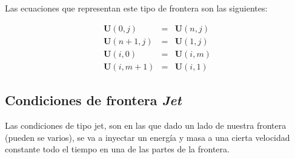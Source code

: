 \documentclass[12pt,a4paper]{book}
\begin{document}
Las ecuaciones que representan este tipo de frontera son las siguientes:

\begin{eqnarray}
\textbf{U}(0,j)&=&\textbf{U}(n,j) \\
\textbf{U}(n+1,j)&=&\textbf{U}(1,j) \\
\textbf{U}(i,0)&=&\textbf{U}(i,m) \\
\textbf{U}(i,m+1)&=&\textbf{U}(i,1) 
\end{eqnarray}


\subsection{Condiciones de frontera \emph{Jet}}

Las condiciones de tipo jet, son en las que dado un lado de nuestra frontera (pueden se varios), se va a inyectar un energía y masa a una cierta velocidad constante todo el tiempo en una de las partes de la frontera.
\end{document}
